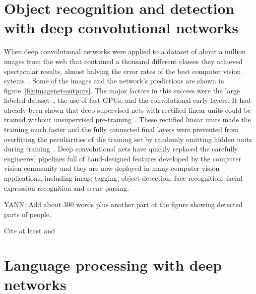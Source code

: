 \documentclass[]{article}
\begin{document}
\section{Object recognition and detection with deep convolutional networks}

When deep convolutional networks were applied to a dataset of about a
million images from the web that contained a thousand different classes
they achieved spectacular results, almost halving the error rates of the
best computer vision sytems~\citep{Krizhevsky-2012-small}.  Some of the images and the
network's predictions are shown in figure~\ref{fig:imagenet-outputs}.  
The major factors in this
success were the large labeled dataset~\citep{imagenet_cvpr09}, the use of fast GPUs,
and the convolutional early layers.  It had already been shown that deep
supervised nets with rectified linear units could be trained without
unsupervised pre-training~\citep{Glorot+al-AI-2011-small}. 
These rectified linear units made the
training much faster and the fully connected final layers were prevented
from overfitting the peculiarities of the training set by randomly omitting
hidden units during training~\citep{Srivastava14}. Deep convolutional nets
have quickly replaced the carefully engineered pipelines full of
hand-designed features developed by the computer vision community and they
are now deployed in many computer vision applications, including image
tagging, object detection, face recognition, facial expression recognition
and scene parsing.

YANN: Add about 300 words plus another part of the figure showing detected
parts of people.

Cite at least \citep{LeCun+98} and \citep{Tompson-et-al-arxiv2014}

\section{Language processing with deep networks}

\end{document}
